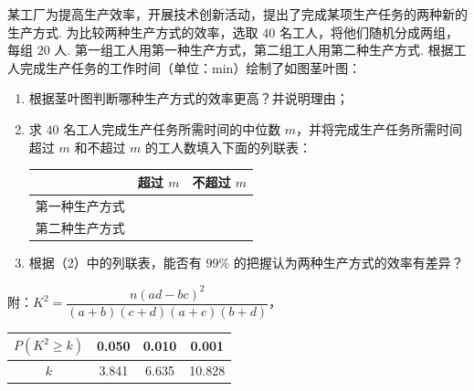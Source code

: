 \begin{problem}
某工厂为提高生产效率，开展技术创新活动，提出了完成某项生产任务的两种新的生产方式. 为比较两种生产方式的效率，选取 \(40\) 名工人，将他们随机分成两组，每组 \(20\) 人. 第一组工人用第一种生产方式，第二组工人用第二种生产方式. 根据工人完成生产任务的工作时间（单位：\(\mathrm{min}\)）绘制了如图茎叶图：



\begin{enumerate}
\item 根据茎叶图判断哪种生产方式的效率更高？并说明理由；
\item 求 \(40\) 名工人完成生产任务所需时间的中位数 \(m\)，并将完成生产任务所需时间超过 \(m\) 和不超过 \(m\) 的工人数填入下面的列联表：
\begin{center}
\begin{tabular}{c|c|c}
 & 超过 \(m\) & 不超过 \(m\) \\
\hline
第一种生产方式 &  &  \\
\hline
第二种生产方式 &  &  \\
\end{tabular}
\end{center}

\item 根据（2）中的列联表，能否有 \(99\%\) 的把握认为两种生产方式的效率有差异？
\end{enumerate}

附：\(K^2=\dfrac{n\left( ad-bc \right)^2}{\left( a+b \right)\left( c+d \right)\left( a+c \right)\left( b+d \right)}\)，

\begin{center}
\begin{tabular}{c|c|c|c}
\(P\left( K^2\ge k \right)\) & 0.050 & 0.010 & 0.001 \\
\hline
\(k\) & 3.841 & 6.635 & 10.828
\end{tabular}
\end{center}
\end{problem}

